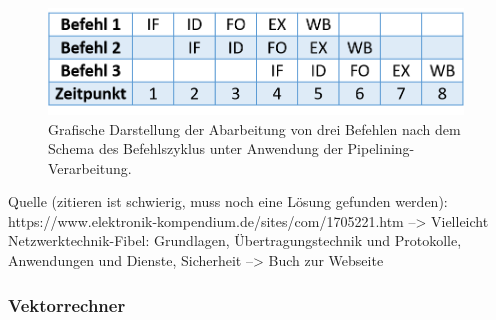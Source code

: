 				\begin{figure}
					\centering	
					\includegraphics[width=11cm]{Abbildungen/Befehlszylus_mit_Pipelining.png}
					\caption{Grafische Darstellung der Abarbeitung von drei Befehlen nach dem Schema des Befehlszyklus unter Anwendung der Pipelining-Verarbeitung.}
					\label{fig:BefehlszylusMitPipelining}
				\end{figure}
			
				Quelle (zitieren ist schwierig, muss noch eine Lösung gefunden werden):
				https://www.elektronik-kompendium.de/sites/com/1705221.htm --> Vielleicht Netzwerktechnik-Fibel: Grundlagen, Übertragungstechnik und Protokolle, Anwendungen und Dienste, Sicherheit --> Buch zur Webseite
				
			\subsubsection{Vektorrechner}
				\label{Vektorrechner}
			

